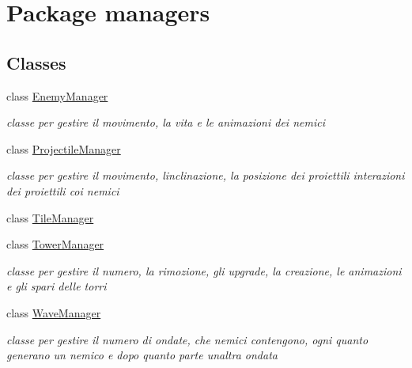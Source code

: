 \hypertarget{namespacemanagers}{}\section{Package managers}
\label{namespacemanagers}
\subsection*{Classes}
\begin{DoxyCompactItemize}
\item 
class \hyperlink{classmanagers_1_1_enemy_manager}{Enemy\+Manager}
\begin{DoxyCompactList}\small\item\em classe per gestire il movimento, la vita e le animazioni dei nemici \end{DoxyCompactList}\item 
class \hyperlink{classmanagers_1_1_projectile_manager}{Projectile\+Manager}
\begin{DoxyCompactList}\small\item\em classe per gestire il movimento, l\textquotesingle{}inclinazione, la posizione dei proiettili interazioni dei proiettili coi nemici \end{DoxyCompactList}\item 
class \hyperlink{classmanagers_1_1_tile_manager}{Tile\+Manager}
\item 
class \hyperlink{classmanagers_1_1_tower_manager}{Tower\+Manager}
\begin{DoxyCompactList}\small\item\em classe per gestire il numero, la rimozione, gli upgrade, la creazione, le animazioni e gli spari delle torri \end{DoxyCompactList}\item 
class \hyperlink{classmanagers_1_1_wave_manager}{Wave\+Manager}
\begin{DoxyCompactList}\small\item\em classe per gestire il numero di ondate, che nemici contengono, ogni quanto generano un nemico e dopo quanto parte un\textquotesingle{}altra ondata \end{DoxyCompactList}\end{DoxyCompactItemize}
